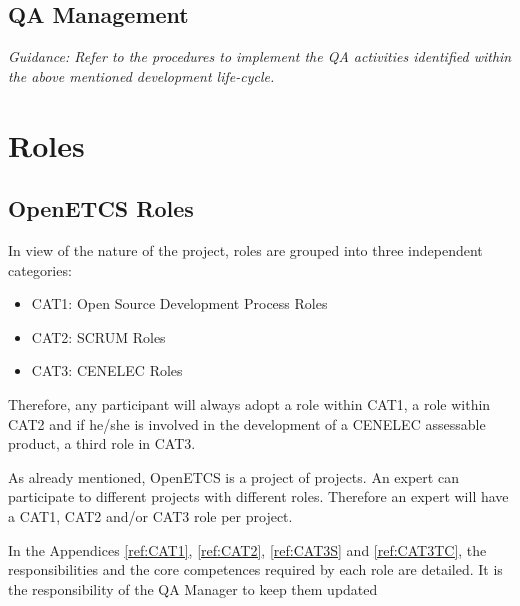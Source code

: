 \documentclass{template/openetcs_article}
\begin{document}
\subsection{QA Management }
\textit{Guidance: Refer to the procedures to implement the QA activities identified within the above mentioned development life-cycle. }



\section{Roles}

\newcommand\todoin[2][]{\todo[inline, caption={2do}, #1]{
\begin{minipage}{\textwidth-4pt}#2\end{minipage}}}

\subsection{OpenETCS Roles}

In view of the nature of the project, roles are grouped into three independent categories:

\begin{itemize}
\item CAT1: Open Source Development Process Roles
\item CAT2: SCRUM Roles
\item CAT3: CENELEC Roles 
\end{itemize}

Therefore, any participant will always adopt a role within CAT1, a role within CAT2 and if he/she is involved in the development of a CENELEC assessable product, a third role in CAT3.

As already mentioned, OpenETCS is a project of projects. An expert can participate to different projects with different roles. Therefore an expert will have a CAT1, CAT2 and/or CAT3 role per project.

In the Appendices \ref{ref:CAT1}, \ref{ref:CAT2}, \ref{ref:CAT3S} and \ref{ref:CAT3TC}, the responsibilities and the core competences required by each role are detailed. It is the responsibility of the QA Manager to keep them updated
\end{document}
